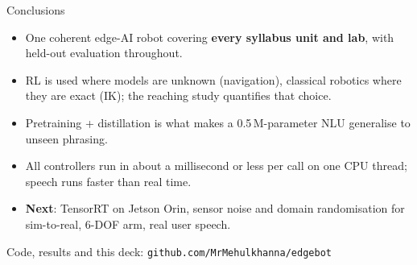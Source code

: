 \documentclass[aspectratio=169,11pt]{beamer}
\begin{document}
\begin{frame}{Conclusions}
\begin{itemize}
\item One coherent edge-AI robot covering \textbf{every syllabus unit and lab}, with held-out evaluation throughout.
\item RL is used where models are unknown (navigation), classical robotics where they are exact (IK);
the reaching study quantifies that choice.
\item Pretraining + distillation is what makes a 0.5\,M-parameter NLU generalise to unseen phrasing.
\item All controllers run in about a millisecond or less per call on one CPU thread; speech runs faster than real time.
\item \textbf{Next}: TensorRT on Jetson Orin, sensor noise and domain randomisation for sim-to-real, 6-DOF arm, real user speech.
\end{itemize}
\vspace{8pt}
\centering\small Code, results and this deck: \texttt{github.com/MrMehulkhanna/edgebot}
\end{frame}
\end{document}
